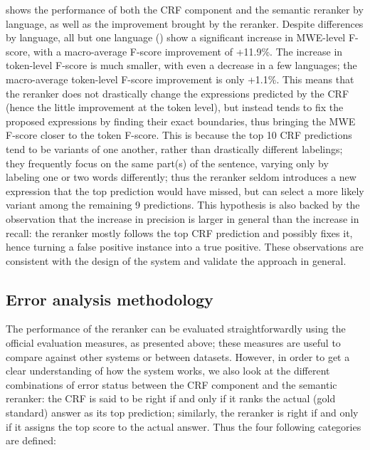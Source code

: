\documentclass[output=paper
,modfonts
,nonflat]{langsci/langscibook}
\begin{document}
 shows the performance of both the CRF
component and the semantic reranker by language, as well as the
improvement brought by the reranker. Despite differences by language,
all but one language () show a significant increase in
MWE-level F-score, with a macro-average F-score improvement of
+11.9\%. The increase in token-level F-score is much smaller, with
even a decrease in a few languages; the macro-average token-level
F-score improvement is only +1.1\%. This means that the reranker does
not drastically change the expressions predicted by the CRF (hence the
little improvement at the token level), but instead tends to fix the
proposed expressions by finding their exact boundaries, thus bringing
the MWE F-score closer to the token F-score.  This is because the top
10 CRF predictions tend to be variants of one another, rather than
drastically different labelings; they frequently focus on the same
part(s) of the sentence, varying only by labeling one or two words
differently; thus the reranker seldom introduces a new expression that
the top prediction would have missed, but can select a more likely
variant among the remaining 9 predictions.  This hypothesis is also
backed by the observation that the increase in precision is larger in
general than the increase in recall: the reranker mostly follows the
top CRF prediction and possibly fixes it, hence turning a false
positive instance into a true positive.  These observations are
consistent with the design of the system and validate the 
approach in general.





\subsection{Error analysis methodology}

\label{moreau:sec:methodology}

The performance of the reranker can be evaluated straightforwardly
using the official evaluation measures, as presented above; these
measures are useful to compare against other systems or between
datasets. However, in order to get a clear understanding of how the
system works, we also look at the different combinations of error
status between the CRF component and the semantic reranker: the CRF is
said to be right if and only if it ranks the actual (gold standard)
answer as its top prediction; similarly, the reranker is right if and
only if it assigns the top score to the actual answer. Thus the four
following categories are defined:
\end{document}

